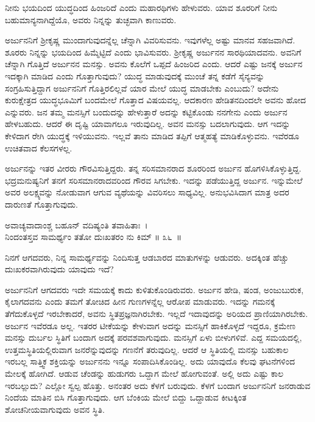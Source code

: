 \begin{artha}
ನೀನು ಭಯದಿಂದ ಯುದ್ಧದಿಂದ ಹಿಂಜರಿದೆ ಎಂದು ಮಹಾರಥಿಗಳು ಹೇಳುವರು. ಯಾವ ಶೂರರಿಗೆ ನೀನು ಬಹುಮಾನ್ಯನಾಗಿದ್ದೆಯೊ, ಅವರು ನಿನ್ನನ್ನು ತುಚ್ಛವಾಗಿ ಕಾಣುವರು.
\end{artha}

ಅರ್ಜುನನಿಗೆ ಶ‍್ರೀಕೃಷ್ಣ ಮುಂದಾಗುವುದನ್ನೆಲ್ಲ ಚೆನ್ನಾಗಿ ವಿವರಿಸುವನು. ಇವುಗಳೆಲ್ಲ ಅಷ್ಟು ಮಾನವ ಸಹಜವಾಗಿದೆ. ಶೂರರು ನಿನ್ನನ್ನು ಭಯದಿಂದ ಹಿಮ್ಮೆಟ್ಟಿದೆ ಎಂದು ಭಾವಿಸುವರು. ಶ‍್ರೀಕೃಷ್ಣ ಅರ್ಜುನನ ಸಾರಥಿಯಾದವನು. ಅವನಿಗೆ ಚೆನ್ನಾಗಿ ಗೊತ್ತಿದೆ ಅರ್ಜುನನ ಮನಸ್ಸು. ಅವನು ಕೊಲೆಗೆ ಒಪ್ಪದೆ ಹಿಂಜರಿದ ಎಂದು. ಆದರೆ ಎಷ್ಟು ಜನಕ್ಕೆ ಅರ್ಜುನ ಇದಕ್ಕಾಗಿ ಮಾಡಿದ ಎಂದು ಗೊತ್ತಾಗುವುದು? ಯುದ್ಧ ಮಾಡುವುದಕ್ಕೆ ಮುಂಚೆ ತನ್ನ ಕಡೆಗೆ ಸೈನ್ಯವನ್ನು ಸಂಗ್ರಹಿಸುತ್ತಿದ್ದಾಗ ಅರ್ಜುನನಿಗೆ ಗೊತ್ತಿರಲಿಲ್ಲವೆ ಯಾರ ಮೇಲೆ ಯುದ್ಧ ಮಾಡಬೇಕು ಎಂಬುದು? ಅದೇನು ಕುರುಕ್ಷೇತ್ರದ ಯುದ್ಧಭೂಮಿಗೆ ಬಂದಮೇಲೆ ಗೊತ್ತಾದ ವಿಷಯವಲ್ಲ. ಆದಕಾರಣ ಹೇಡಿತನದಿಂದಲೇ ಅವನು ಹೋದ ಎನ್ನುವರು. ಜನ ತಮ್ಮ ಮನಸ್ಸಿಗೆ ಬಂದುದನ್ನು ಹೇಳುತ್ತಾರೆ ಅದನ್ನು ಕಟ್ಟಿಕೊಂಡು ನನಗೇನು ಎಂದು ಅರ್ಜುನ ಹೇಳಬಹುದು. ಆದರೆ ಈ ದೃಷ್ಟಿ ಯಾವಾಗಲೂ ಇರುವುದಿಲ್ಲ. ಅವನ ಮನಸ್ಸು ಬದಲಾಗುವುದು. ಆಗ ಇದನ್ನು ಕೇಳಿದಾಗ ರೇಗಿ ಯುದ್ಧಕ್ಕೆ ಇಳಿಯುವನು. ಇಲ್ಲವೆ ತಾನು ಮಾಡಿದ ತಪ್ಪಿಗೆ ಆತ್ಮಹತ್ಯೆ ಮಾಡಿಕೊಳ್ಳುವನು. ಇವೆರಡೂ ಉಚಿತವಾದ ಕೆಲಸಗಳಲ್ಲ. 

ಅರ್ಜುನನ್ನು ಇತರ ವೀರರು ಗೌರವಿಸುತ್ತಿದ್ದರು. ತನ್ನ ಸರಿಸಮಾನರಾದ ಶೂರರಿಂದ ಅರ್ಜುನ ಹೊಗಳಿಸಿಕೊಳ್ಳುತ್ತಿದ್ದ. ಭದ್ರಮನುಷ್ಯನಿಗೆ ತನಗೆ ಸರಿಸಮಾನರಾದವರಿಂದ ಗೌರವ ಸಿಗಬೇಕು. ಇದನ್ನು ಪಡೆಯುತ್ತಿದ್ದ ಅರ್ಜುನ. ಇನ್ನುಮೇಲೆ ಅವರ ಅಲಕ್ಷ್ಯವನ್ನು ನೋಡುವಾಗ ಆಗುವ ವ್ಯಥೆಯನ್ನು ವಿವರಿಸಲು ಸಾಧ್ಯವಿಲ್ಲ. ಅನುಭವಿಸಿದಾಗ ಮಾತ್ರ ಅದರ ದಾರುಣತೆ ಗೊತ್ತಾಗುವುದು.

\begin{shloka}
ಅವಾಚ್ಯವಾದಾಂಶ್ಚ ಬಹೂನ್ ವದಿಷ್ಯಂತಿ ತವಾಹಿತಾಃ~।\\ನಿಂದಂತಸ್ತವ ಸಾಮರ್ಥ್ಯಂ ತತೋ ದುಃಖತರಂ ನು ಕಿಮ್ \hfill॥ ೩೬~॥
\end{shloka}

\begin{artha}
ನಿನಗೆ ಆಗದವರು, ನಿನ್ನ ಸಾಮರ್ಥ್ಯವನ್ನು ನಿಂದಿಸುತ್ತ ಆಡಬಾರದ ಮಾತುಗಳನ್ನು ಆಡುವರು. ಅದಕ್ಕಿಂತ ಹೆಚ್ಚು ದುಃಖಕರವಾಗಿರುವುದು ಯಾವುದು ಇದೆ?
\end{artha}

ಅರ್ಜುನನಿಗೆ ಆಗದವರು ಇದೇ ಸಮಯಕ್ಕೆ ಕಾದು ಕುಳಿತುಕೊಂಡಿರುವರು. ಅರ್ಜುನ ಹೇಡಿ, ಷಂಡ, ಅಂಜುಬುರುಕ, ಕೈಲಾಗದವನು ಎಂದು ತಮಗೆ ತೋಚಿದ ಹೀನ ಗುಣಗಳನ್ನೆಲ್ಲ ಆರೋಪ ಮಾಡುವರು. ಇದನ್ನು ಗಮನಕ್ಕೆ ತೆಗೆದುಕೊಳ್ಳದೆ ಇರಬೇಕಾದರೆ, ಅವನು ಸ್ಥಿತಪ್ರಜ್ಞ\-ನಾಗಿರಬೇಕು. ಇಲ್ಲದೆ ಇದಾವುದನ್ನು ಅರಿಯದ ಪ್ರಾಣಿಯಾಗಿರಬೇಕು. ಅರ್ಜುನ ಇವೆರಡೂ ಅಲ್ಲ. ಇತರರ ಟೀಕೆಯನ್ನು ಕೇಳುವಾಗ ಅದನ್ನು ಮನಸ್ಸಿಗೆ ಹಾಕಿಕೊಳ್ಳದೆ ಇದ್ದರೂ, ಕ್ರಮೇಣ ಮನಸ್ಸು ದುರ್ಬಲ ಸ್ಥಿತಿಗೆ ಬಂದಾಗ ಅದಕ್ಕೆ ಪರವಶವಾಗುವುದು. ಮನಸ್ಸಿಗೆ ಏಳು ಬೀಳುಗಳಿವೆ. ಎದ್ದ ಸಮಯದಲ್ಲಿ, ಉತ್ತಮಸ್ಥಿತಿಯಲ್ಲಿರುವಾಗ ಜನರೆನ್ನುವುದನ್ನು ಗಣನೆಗೆ ತರುವುದಿಲ್ಲ. ಆದರೆ ಆ ಸ್ಥಿತಿಯಲ್ಲಿ ಮನಸ್ಸು ಬಹುಕಾಲ ಇರಬಲ್ಲ ಸಾತ್ತ್ವಿಕ ಶಕ್ತಿಯನ್ನು ಅರ್ಜುನನು ಇನ್ನೂ ಸಂಪಾದಿಸಿಕೊಂಡಿಲ್ಲ. ಅದು ಯಾವುದೊ ಕೆಲವು ಘಟನೆಗಳಿಂದ ಮೇಲಕ್ಕೆ ಹೋಗಿದೆ. ಆಡುವ ಚೆಂಡನ್ನು ಹುಡುಗರು ಒದ್ದಾಗ ಮೇಲೆ ಹೋಗುವಂತೆ. ಅಲ್ಲಿ ಅದು ಎಷ್ಟು ಕಾಲ ಇರಬಲ್ಲುದು? ಎಲ್ಲೋ ಸ್ವಲ್ಪ ಹೊತ್ತು. ಅನಂತರ ಅದು ಕೆಳಗೆ ಬರುವುದು. ಕೆಳಗೆ ಬಂದಾಗ ಅರ್ಜುನನಿಗೆ ಜನರಾಡುವ ನಿಂದೆಯ ಮಾತಿನ ಬಿಸಿ ಗೊತ್ತಾಗುವುದು. ಆಗ ಬೆಂಕಿಯ ಮೇಲೆ ಬಿದ್ದು ಒದ್ದಾಡುವ ಕೀಟಕ್ಕಿಂತ ಶೋಚನೀಯವಾಗುವುದು ಅವನ ಸ್ಥಿತಿ.

